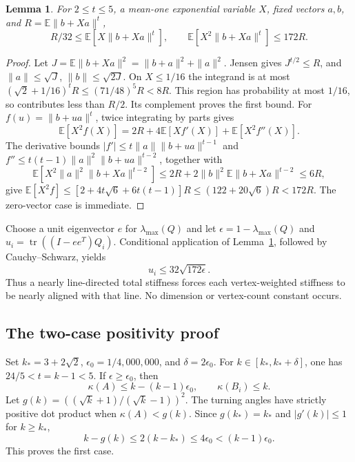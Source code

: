 \documentclass[11pt]{article}
\newtheorem{lemma}[theorem]{Lemma}
\theoremstyle{definition}
\newcommand{\E}{\mathbb E}
\newcommand{\tr}{\operatorname{tr}}
\begin{document}
\begin{lemma}\label{lem:exponential}
For $2\le t\le5$, a mean-one exponential variable $X$, fixed vectors
$a,b$, and $R=\E\|b+Xa\|^t$,
\begin{equation}\label{eq:moments}
 R/32\le\E[X\|b+Xa\|^t],\qquad
 \E[X^2\|b+Xa\|^t]\le172R.
\end{equation}
\end{lemma}
\begin{proof}
Let $J=\E\|b+Xa\|^2=\|b+a\|^2+\|a\|^2$. Jensen gives
$J^{t/2}\le R$, and $\|a\|\le\sqrt J$, $\|b\|\le\sqrt{2J}$.
On $X\le1/16$ the integrand is at most $(\sqrt2+1/16)^tR\le
(71/48)^5R<8R$. This region has probability at most $1/16$, so contributes
less than $R/2$. Its complement proves the first bound.
For $f(u)=\|b+ua\|^t$, twice integrating by parts gives
\[
 \E[X^2f(X)]=2R+4\E[Xf'(X)]+\E[X^2f''(X)].
\]
The derivative bounds $|f'|\le t\|a\|\|b+ua\|^{t-1}$ and
$f''\le t(t-1)\|a\|^2\|b+ua\|^{t-2}$, together with
\[
 \E[X^2\|a\|^2\|b+Xa\|^{t-2}]\le
 2R+2\|b\|^2\E\|b+Xa\|^{t-2}\le6R,
\]
give $\E[X^2f]\le[2+4t\sqrt6+6t(t-1)]R\le
(122+20\sqrt6)R<172R$. The zero-vector case is immediate.
\end{proof}

Choose a unit eigenvector $e$ for $\lambda_{\max}(Q)$ and let
$\epsilon=1-\lambda_{\max}(Q)$ and
$u_i=\tr((I-ee^T)Q_i)$. Conditional application of
Lemma~\ref{lem:exponential}, followed by Cauchy--Schwarz, yields
\begin{equation}\label{eq:tilt}
 u_i\le32\sqrt{172\epsilon}.
\end{equation}
Thus a nearly line-directed total stiffness forces each vertex-weighted
stiffness to be nearly aligned with that line. No dimension or vertex-count
constant occurs.

\subsection{The two-case positivity proof}
Set $k_*=3+2\sqrt2$, $\epsilon_0=1/4{,}000{,}000$, and
$\delta=2\epsilon_0$. For $k\in[k_*,k_*+\delta]$, one has
$24/5<t=k-1<5$. If $\epsilon\ge\epsilon_0$, then
\[
 \kappa(A)\le k-(k-1)\epsilon_0,\qquad \kappa(B_i)\le k.
\]
Let $g(k)=((\sqrt k+1)/(\sqrt k-1))^2$.
The turning angles have strictly positive dot product when
$\kappa(A)<g(k)$. Since $g(k_*)=k_*$ and $|g'(k)|\le1$ for $k\ge k_*$,
\[
 k-g(k)\le2(k-k_*)\le4\epsilon_0<(k-1)\epsilon_0.
\]
This proves the first case.
\end{document}
